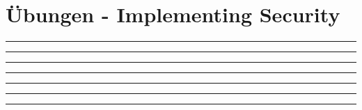 \section{Übungen - Implementing Security}
  \begin{enumerate}
    
    
    

      \rule{0.94\textwidth}{0.5pt}

    
    

      \rule{0.94\textwidth}{0.5pt}

      \rule{0.94\textwidth}{0.5pt}

    
    
    
    

      \rule{0.94\textwidth}{0.5pt}

    
\clearpage
    

      \rule{0.94\textwidth}{0.5pt}


      \rule{0.94\textwidth}{0.5pt}


      \rule{0.94\textwidth}{0.5pt}

  \end{enumerate}
\clearpage
